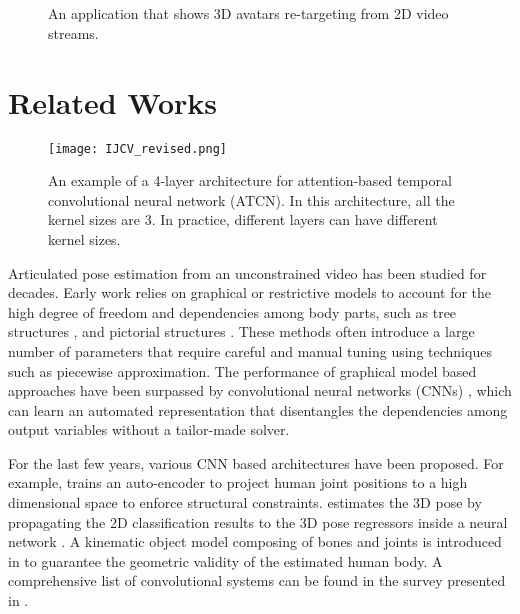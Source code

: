 \documentclass[twocolumn]{svjour3}          \smartqed  \usepackage{graphicx}
\begin{document}
\begin{figure}

\\
\vspace{-0.35cm}
\\
\vspace{-0.35cm}
\caption{An application that shows 3D avatars re-targeting from 2D video streams.}
\label{fig:all_6}
\end{figure}

\section{Related Works}
\begin{figure*}
  \texttt{[image: IJCV\_revised.png]}
  \caption{ An example of a 4-layer architecture for attention-based temporal convolutional neural network (ATCN). In this architecture, all the kernel sizes are 3. In practice, different layers can have different kernel sizes.}\label{fig:architecture}
\end{figure*}
Articulated pose estimation from an unconstrained video has been studied for decades. Early work relies on graphical or restrictive models to account for the high degree of freedom and dependencies among body parts, such as tree structures \citep{Andriluka2009, Yang2011, Amin13}, and pictorial structures \citep{Andriluka2009}. These methods often introduce a large number of parameters that require careful and manual tuning using techniques such as piecewise approximation. The performance of graphical model based approaches have been surpassed by convolutional neural networks (CNNs) \citep{Sarafianos2016, Pavlakos2017}, which can learn an automated representation that disentangles the dependencies among output variables without a tailor-made solver.

For the last few years, various CNN based architectures have been proposed. For example, \citep{Tekin2016} trains an auto-encoder to project human joint positions to a high dimensional space to enforce structural constraints. \citep{Park2016} estimates the 3D pose by propagating the 2D classification results to the 3D pose regressors inside a neural network \citep{Park2016}.  A  kinematic object model composing of bones and joints is introduced in \citep{Zhou20162} to guarantee the geometric validity of the estimated human body. A comprehensive list of convolutional systems can be found in the survey presented in \citep{Sarafianos2016}. 
\end{document}
